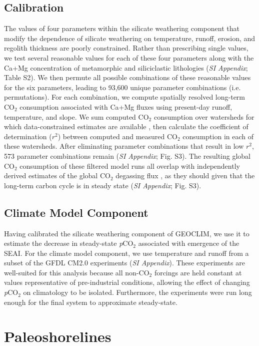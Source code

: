 \documentclass[9pt,twocolumn,twoside,lineno]{pnas-new}
\newcommand{\pCOtwo}{\textit{p}CO$_{2}$\xspace}
\newcommand{\COtwo}{CO$_{2}$\xspace}
\newcommand{\SI}{\textit{SI Appendix}\xspace}
\begin{document}
\subsection*{Calibration}

The values of four parameters within the silicate weathering component that modify the dependence of silicate weathering on temperature, runoff, erosion, and regolith thickness are poorly constrained. Rather than prescribing single values, we test several reasonable values for each of these four parameters along with the Ca+Mg concentration of metamorphic and siliciclastic lithologies (\SI; Table S2). We then permute all possible combinations of these reasonable values for the six parameters, leading to 93,600 unique parameter combinations (i.e. permutations). For each combination, we compute spatially resolved long-term \COtwo consumption associated with Ca+Mg fluxes using present-day runoff, temperature, and slope. We sum computed \COtwo consumption over watersheds for which data-constrained estimates are available \cite{Gaillardet1999a, Moquet2018a}, then calculate the coefficient of determination ($r^{2}$) between computed and measured \COtwo consumption in each of these watersheds. After eliminating parameter combinations that result in low $r^{2}$, 573 parameter combinations remain (\SI; Fig. S3). The resulting global \COtwo consumption of these filtered model runs all overlap with independently derived estimates of the global \COtwo degassing flux \cite{Gerlach2011a}, as they should given that the long-term carbon cycle is in steady state (\SI; Fig. S3).

\subsection*{Climate Model Component}

Having calibrated the silicate weathering component of GEOCLIM, we use it to estimate the decrease in steady-state \pCOtwo associated with emergence of the SEAI. For the climate model component, we use temperature and runoff from a subset of the GFDL CM2.0 experiments \cite{Delworth2006b} (\SI). These experiments are well-suited for this analysis because all non-\COtwo forcings are held constant at values representative of pre-industrial conditions, allowing the effect of changing \pCOtwo on climatology to be isolated. Furthermore, the experiments were run long enough for the final system to approximate steady-state.

\section*{Paleoshorelines}
\end{document}
